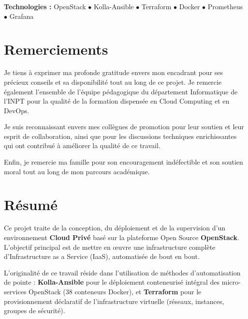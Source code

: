 \documentclass[12pt,a4paper,oneside]{book}
\begin{document}
\begin{titlepage}
\vspace{1.5cm}
{\large\textbf{Technologies :} OpenStack $\bullet$ Kolla-Ansible $\bullet$ Terraform $\bullet$ Docker $\bullet$ Prometheus $\bullet$ Grafana\par}
\end{titlepage}

\frontmatter

\chapter*{Remerciements}

Je tiens \`a exprimer ma profonde gratitude envers mon encadrant pour ses pr\'ecieux conseils et sa disponibilit\'e tout au long de ce projet. Je remercie \'egalement l'ensemble de l'\'equipe p\'edagogique du d\'epartement Informatique de l'INPT pour la qualit\'e de la formation dispens\'ee en Cloud Computing et en DevOps.

Je suis reconnaissant envers mes coll\`egues de promotion pour leur soutien et leur esprit de collaboration, ainsi que pour les discussions techniques enrichissantes qui ont contribu\'e \`a am\'eliorer la qualit\'e de ce travail.

Enfin, je remercie ma famille pour son encouragement ind\'efectible et son soutien moral tout au long de mon parcours acad\'emique.

\chapter*{R\'esum\'e}

Ce projet traite de la conception, du d\'eploiement et de la supervision d'un environnement \textbf{Cloud Priv\'e} bas\'e sur la plateforme Open Source \textbf{OpenStack}. L'objectif principal est de mettre en \oe{}uvre une infrastructure compl\`ete d'Infrastructure as a Service (IaaS), automatis\'ee de bout en bout.

L'originalit\'e de ce travail r\'eside dans l'utilisation de m\'ethodes d'automatisation de pointe : \textbf{Kolla-Ansible} pour le d\'eploiement conteneuris\'e int\'egral des micro-services OpenStack (38 conteneurs Docker), et \textbf{Terraform} pour le provisionnement d\'eclaratif de l'infrastructure virtuelle (r\'eseaux, instances, groupes de s\'ecurit\'e).
\end{document}
